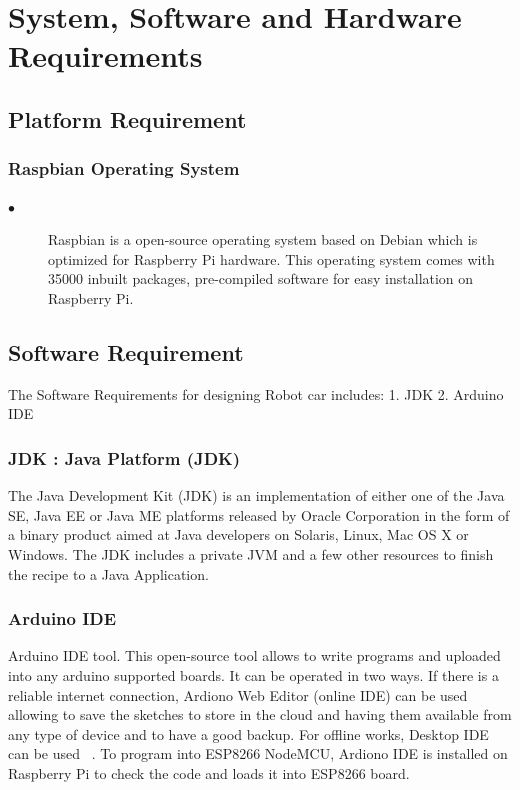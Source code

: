 \documentclass[sigconf]{acmart}
\begin{document}
\section{System, Software and Hardware Requirements}
\subsection{Platform Requirement}
\subsubsection{Raspbian Operating System}
\begin{description}
\item[$\bullet$] Raspbian is a open-source operating system based on Debian which is optimized for Raspberry Pi hardware. This operating system comes with 35000 inbuilt packages, pre-compiled software for easy installation on Raspberry Pi.
\end{description}

\subsection{Software Requirement}
The Software Requirements for designing Robot car includes:
1. JDK
2. Arduino IDE

\subsubsection{JDK : Java Platform (JDK)}
The Java Development Kit (JDK) is an implementation
of either one of the Java SE, Java EE or Java ME platforms released by Oracle Corporation in the form of a binary product aimed at Java developers on Solaris, Linux, Mac OS X or Windows. The JDK includes a private JVM and a few other resources to finish the recipe to a Java Application.

\subsubsection{Arduino IDE}
Arduino IDE tool. This open-source tool allows to write programs and uploaded into any arduino supported boards. It can be operated in two ways. If there is a reliable internet connection, Ardiono Web Editor (online IDE) can be used allowing to save the sketches to store in the cloud and having them available from any type of device and to have a good backup. For offline works, Desktop IDE can be used ~\cite{arduino2015}. To program into ESP8266 NodeMCU, Ardiono IDE is installed on Raspberry Pi to check the code and loads it into ESP8266 board.
\end{document}
